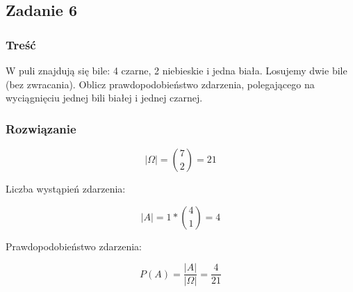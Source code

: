 \subsection{Zadanie 6}

\subsubsection*{Treść}
W puli znajdują się bile: 4 czarne, 2 niebieskie i jedna biała. Losujemy dwie bile (bez zwracania). Oblicz prawdopodobieństwo zdarzenia, polegającego na wyciągnięciu jednej bili białej i jednej czarnej. 


\subsubsection*{Rozwiązanie}
$$ |\Omega|= \binom{7}{2}=21 $$

Liczba wystąpień zdarzenia:

$$ |A| = 1* \binom{4}{1}=4 $$

Prawdopodobieństwo zdarzenia:

$$ P(A)=\frac{|A|}{|\Omega|}=\frac{4}{21} $$

